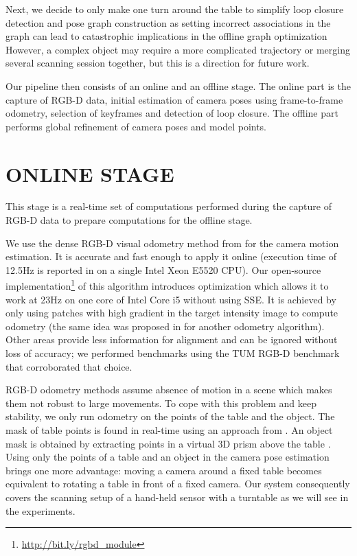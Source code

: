 \documentclass[letterpaper, 10 pt, conference]{ieeeconf}  %
\begin{document}

Next, we decide to only make one turn around the table to simplify loop closure detection and pose graph construction as
setting incorrect associations
in the graph can lead to catastrophic implications in the offline graph
optimization \cite{sunderhauf2012switchable}
However, a complex object may require a more complicated trajectory
or merging several scanning session together, %
but this is a direction for future work.

Our pipeline then consists of an online and an offline stage. The online part is the capture of RGB-D data,
initial estimation of camera poses using frame-to-frame odometry,
selection of keyframes and detection of loop closure. The offline part performs
global refinement of camera poses and model points.

\section{ONLINE STAGE}

\label{sec:online}

This stage is a real-time set of computations performed during the capture of RGB-D data to prepare computations for 
the offline stage.

We use the dense RGB-D visual odometry
method from \cite{steinbrucker2011real} for the camera motion estimation.
It is accurate and fast enough to apply it online
(execution time of 12.5Hz is reported in \cite{steinbrucker2011real}
on a single Intel Xeon E5520 CPU).
Our open-source implementation\footnote{\label{note1}\href{http://bit.ly/rgbd\_module}{http://bit.ly/rgbd\_module}} of this algorithm
introduces optimization which allows it to work at 23Hz on one core
of Intel Core i5 without using SSE.
It is achieved by only using patches with high gradient in the target intensity image
to compute odometry (the same idea was proposed in \cite{tykkala2011direct} for another odometry algorithm).
Other areas provide less information for alignment
and can be ignored without loss of accuracy; we performed benchmarks 
using the TUM RGB-D benchmark \cite{sturm12iros} that corroborated that choice.

RGB-D odometry methods assume absence of motion in a scene which makes them not
robust to large movements. To cope with this problem and keep stability, we only run odometry
on the points of the table and the object. The mask of table points
is found in real-time using an approach from \cite{poppinga2008fast}. An object mask is
obtained by extracting points in a virtual 3D prism above the table \cite{rusu2009detecting}.
Using only the points
of a table and an object in the camera pose estimation brings one more advantage:
moving a camera around a fixed table becomes equivalent to rotating
a table in front of a fixed camera. Our system consequently covers the scanning setup of a hand-held sensor with a 
turntable as we will see in the experiments.
\end{document}
